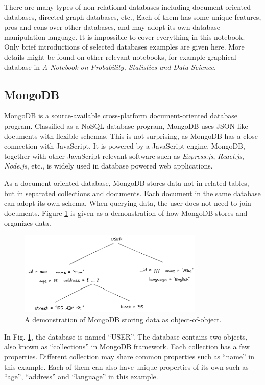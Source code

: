 There are many types of non-relational databases including document-oriented databases, directed graph databases, etc., Each of them has some unique features, pros and cons over other databases, and may adopt its own database manipulation language. It is impossible to cover everything in this notebook. Only brief introductions of selected databases examples are given here. More details might be found on other relevant notebooks, for example graphical database in \textit{A Notebook on Probability, Statistics and Data Science}.

\subsection{MongoDB}

MongoDB is a source-available cross-platform document-oriented database program. Classified as a NoSQL database program, MongoDB uses JSON-like documents with flexible schemas. This is not surprising, as MongoDB has a close connection with JavaScript. It is powered by a JavaScript engine. MongoDB, together with other JavaScript-relevant software such as \textit{Express.js}, \textit{React.js}, \textit{Node.js}, etc., is widely used in database powered web applications.

As a document-oriented database, MongoDB stores data not in related tables, but in separated collections and documents. Each document in the same database can adopt its own schema. When querying data, the user does not need to join documents. Figure \ref{ch:database:mongotree} is given as a demonstration of how MongoDB stores and organizes data.
\begin{figure}
	\centering
	\includegraphics[width=250pt]{chapters/ch-database/figures/mongodb_tree.png}
	\caption{A demonstration of MongoDB storing data as object-of-object.} \label{ch:database:mongotree}
\end{figure}
In Fig. \ref{ch:database:mongotree}, the database is named ``USER''. The database contains two objects, also known as ``collections'' in MongoDB framework. Each collection has a few properties. Different collection may share common properties such as ``name'' in this example. Each of them can also have unique properties of its own such as ``age'', ``address'' and ``language'' in this example.


